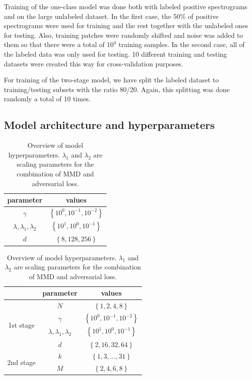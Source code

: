 Training of the one-class model was done both with labeled positive spectrograms and on the large unlabeled dataset. In the first case, the 50\% of positive spectrograms were used for training and the rest together with the unlabeled ones for testing. Also, training patches were randomly shifted and noise was added to them so that there were a total of $10^4$ training samples. In the second case, all of the labeled data was only used for testing. 10 different training and testing datasets were created this way for cross-validation purposes.

For training of the two-stage model, we have split the labeled dataset to training/testing subsets with the ratio 80/20. Again, this splitting was done randomly a total of 10 times.

\subsection{Model architecture and hyperparameters}

\begin{table}
\centering

\captionsetup[subtable]{position = below}
\captionsetup[table]{position=below}

\begin{subtable}{0.4\linewidth}
  \centering
  \begin{tabular}{c | c}
     parameter & values\tabularnewline
    \hline 
    $\gamma$ & $\left\{ 10^{0},10^{-1},10^{-2}\right\} $\tabularnewline
    $\lambda,\lambda_{1},\lambda_{2}$ & $\left\{ 10^{1},10^{0},10^{-1}\right\} $\tabularnewline
    $d$ & $\left\{ 8, 128,256\right\} $\tabularnewline
    
  \end{tabular}
  \caption{One-class model.}
  \label{tab:1c_params}
\end{subtable}
\hspace*{4em}
\begin{subtable}{0.4\linewidth}
  \centering
  \begin{tabular}{c  c | c}
      & parameter & values\tabularnewline
    \hline 
    \multirow{4}{*}{1st stage} & $N$ & $\left\{ 1,2,4,8\right\} $\tabularnewline
    & $\gamma$ & $\left\{ 10^{0},10^{-1},10^{-2}\right\} $\tabularnewline
    & $\lambda,\lambda_{1},\lambda_{2}$ & $\left\{ 10^{1},10^{0},10^{-1}\right\} $\tabularnewline
    & $d$ & $\left\{ 2,16,32,64\right\} $\tabularnewline
    \hline
    \multirow{2}{*}{2nd stage} & $k$ & $\left\{ 1,3,\ldots,31\right\} $\tabularnewline
    & $M$ & $\left\{ 2,4,6,8\right\} $\tabularnewline

  \end{tabular}
  \caption{Two-stage model.}
  \label{tab:2s_params}
\end{subtable}
\caption{Overview of model hyperparameters. $\lambda_{1}$ and $\lambda_{2}$ are scaling parameters for the combination of MMD and adversarial loss.}
\end{table}

